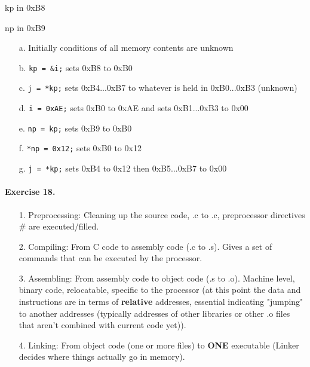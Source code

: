 \documentclass[12pt]{article}
\begin{document}
kp in 0xB8

np in 0xB9

\begin{itemize}
    \item[a.]
    Initially conditions of all memory contents are unknown

    \item[b.]
    \verb|kp = &i;| sets 0xB8 to 0xB0

    \item[c.]
    \verb|j = *kp;| sets 0xB4...0xB7 to whatever is held in 0xB0...0xB3 (unknown) 

    \item[d.]
    \verb|i = 0xAE;| sets 0xB0 to 0xAE and sets 0xB1...0xB3 to 0x00

    \item[e.]
    \verb|np = kp;| sets 0xB9 to 0xB0

    \item[f.]
    \verb|*np = 0x12;| sets 0xB0 to 0x12

    \item[g.]
    \verb|j = *kp;| sets 0xB4 to 0x12 then 0xB5...0xB7 to 0x00
\end{itemize}

\paragraph{Exercise 18.}

\begin{itemize}
    \item [1.]
    Preprocessing: Cleaning up the source code, .c to .c, preprocessor directives \# are executed/filled.

    \item [2.]
    Compiling: From C code to assembly code (.c to .s).
    Gives a set of commands that can be executed by the processor.

    \item [3.]
    Assembling: From assembly code to object code (.s to .o).
    Machine level, binary code, relocatable, specific to the processor (at this point the data and instructions are in terms of \textbf{relative} addresses, essential indicating "jumping" to another addresses (typically addresses of other libraries or other .o files that aren't combined with current code yet)).
    \item [4.]
    Linking: From object code (one or more files) to \textbf{ONE} executable (Linker decides where things actually go in memory).

\end{itemize}
\end{document}
